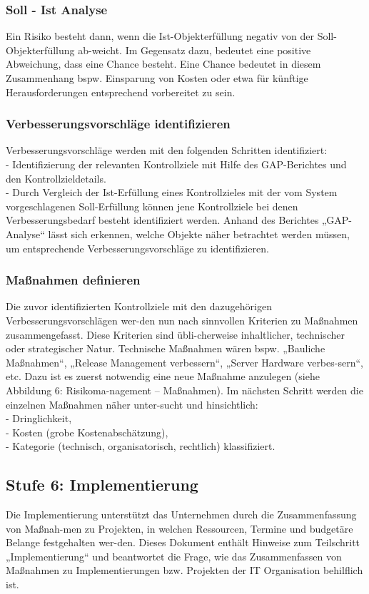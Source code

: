 \subsubsection{Soll - Ist Analyse}
Ein Risiko besteht dann, wenn die Ist-Objekterfüllung negativ von der Soll-Objekterfüllung ab-weicht. Im Gegensatz dazu, bedeutet eine positive Abweichung, dass eine Chance besteht. Eine Chance bedeutet in diesem Zusammenhang bspw. Einsparung von Kosten oder etwa für künftige Herausforderungen entsprechend vorbereitet zu sein.

\subsubsection{Verbesserungsvorschläge identifizieren}
Verbesserungsvorschläge werden mit den folgenden Schritten identifiziert:\\
- Identifizierung der relevanten Kontrollziele mit Hilfe des GAP-Berichtes und den Kontrollzieldetails.
\\- Durch Vergleich der Ist-Erfüllung eines Kontrollzieles mit der vom System vorgeschlagenen Soll-Erfüllung können jene Kontrollziele bei denen Verbesserungsbedarf besteht identifiziert werden.
Anhand des Berichtes „GAP-Analyse“ lässt sich erkennen, welche Objekte näher betrachtet werden müssen, um entsprechende Verbesserungsvorschläge zu identifizieren.
\subsubsection{Maßnahmen definieren}
Die zuvor identifizierten Kontrollziele mit den dazugehörigen Verbesserungsvorschlägen wer-den nun nach sinnvollen Kriterien zu Maßnahmen zusammengefasst. Diese Kriterien sind übli-cherweise inhaltlicher, technischer oder strategischer Natur. Technische Maßnahmen wären bspw. „Bauliche Maßnahmen“, „Release Management verbessern“, „Server Hardware verbes-sern“, etc.
Dazu ist es zuerst notwendig eine neue Maßnahme anzulegen (siehe Abbildung 6: Risikoma-nagement – Maßnahmen). Im nächsten Schritt werden die einzelnen Maßnahmen näher unter-sucht und hinsichtlich:\\
- Dringlichkeit,\\
- Kosten (grobe Kostenabschätzung),\\
- Kategorie (technisch, organisatorisch, rechtlich)
klassifiziert.
\subsection{Stufe 6: Implementierung}
Die Implementierung unterstützt das Unternehmen durch die Zusammenfassung von Maßnah-men zu Projekten, in welchen Ressourcen, Termine und budgetäre Belange festgehalten wer-den.
Dieses Dokument enthält Hinweise zum Teilschritt „Implementierung“ und beantwortet die Frage, wie das Zusammenfassen von Maßnahmen zu Implementierungen bzw. Projekten der IT Organisation behilflich ist.
